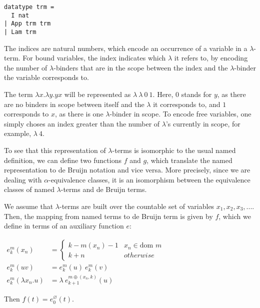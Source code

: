 \documentclass[a4paper, 12pt, twoside]{style/ociamthesis}
\theoremstyle{plain}
\theoremstyle{definition}
\newtheorem{Example}{Example}[chapter]
\theoremstyle{remark}
\let\emptyset\varnothing
\renewenvironment{Example}{\begin{OldExample}\begin{mdframed}[style=example, linecolor=yellow]}{\end{mdframed}\end{OldExample}}
\begin{document}
\begin{verbatim}
datatype trm =
  I nat
| App trm trm
| Lam trm
\end{verbatim}

The indices are natural numbers, which encode an occurrence of a
variable in a \(\lambda\)-term. For bound variables, the index indicates
which \(\lambda\) it refers to, by encoding the number of
\(\lambda\)-binders that are in the scope between the index and the
\(\lambda\)-binder the variable corresponds to.

\begin{Example}

The term \(\lambda x.\lambda y. yx\) will be represented as
\(\lambda\ \lambda\ 0\ 1\). Here, 0 stands for \(y\), as there are no
binders in scope between itself and the \(\lambda\) it corresponds to,
and \(1\) corresponds to \(x\), as there is one \(\lambda\)-binder in
scope. To encode free variables, one simply choses an index greater than
the number of \(\lambda\)'s currently in scope, for example,
\(\lambda\ 4\).

\end{Example}

To see that this representation of \(\lambda\)-terms is isomorphic to
the usual named definition, we can define two functions \(f\) and \(g\),
which translate the named representation to de Bruijn notation and vice
versa. More precisely, since we are dealing with \(\alpha\)-equivalence
classes, it is an isomorphism between the equivalence classes of named
\(\lambda\)-terms and de Bruijn terms.

We assume that \(\lambda\)-terms are built over the countable set of
variables \(x_1,x_2,x_3,...\). Then, the mapping from named terms to de
Bruijn term is given by \(f\), which we define in terms of an auxiliary
function \(e\):

\begin{center}
$\begin{aligned}
e_k^m(x_n) &= \begin{cases}
k-m(x_n)-1 & x_n \in \text{dom }m\\
k+n & otherwise
\end{cases}\\
e_k^m(uv) &= e_k^m(u)\ e_k^m(v)\\
e_k^m(\lambda x_n.u) &= \lambda\ e_{k+1}^{m \oplus (x_n,k)}(u)
\end{aligned}$
\end{center}

Then \(f(t) = e_0^\emptyset(t)\).
\end{document}
